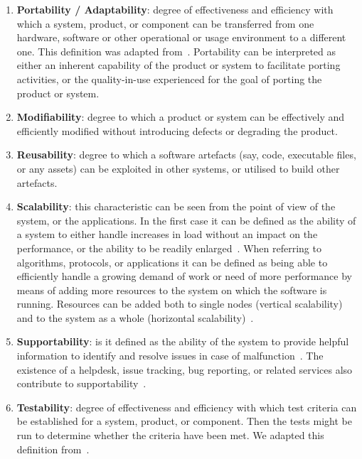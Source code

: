 \begin{enumerate}
    \item \textbf{Portability / Adaptability}: degree of effectiveness and efficiency with which a system, product, or component can be transferred from one hardware, software or other operational or usage environment to a different one. This definition was adapted from~\cite{iso_central_secretary_isoiecieee_2010}. Portability can be interpreted as either an inherent capability of the product or system to facilitate porting activities, or the quality-in-use experienced for the goal of porting the product or system.

    \item \textbf{Modifiability}: degree to which a product or system can be effectively and efficiently modified without introducing defects or degrading the product.%

    \item \textbf{Reusability}: degree to which a software artefacts (say, code, executable files, or any assets) can be exploited in other systems, or utilised to build other artefacts.

    \item \textbf{Scalability}: this characteristic can be seen from the point of view of the system, or the applications. In the first case it can be defined as the ability of a system to either handle increases in load without an impact on the performance, or the ability to be readily enlarged~\cite{microsoft_2010}. When referring to algorithms, protocols, or applications it can be defined as being able to efficiently handle a growing demand of work or need of more performance by means of adding more resources to the system on which the software is running. Resources can be added both to single nodes (vertical scalability) and to the system as a whole (horizontal scalability)~\cite{bondi_2000}.

    \item \textbf{Supportability}: is it defined as the ability of the system to provide helpful information  to identify and resolve issues in case of malfunction~\cite{microsoft_2010}. The existence of a helpdesk,  issue tracking, bug reporting, or related services also contribute to supportability~\cite{orviz_fernandez_eosc-synergy_2020}.

    \item \textbf{Testability}: degree of effectiveness and efficiency with which test criteria can be established for a system, product, or component. Then the tests might be run to determine whether the criteria have been met. We adapted this definition from~\cite{iso_central_secretary_isoiecieee_2010}.
\end{enumerate}


